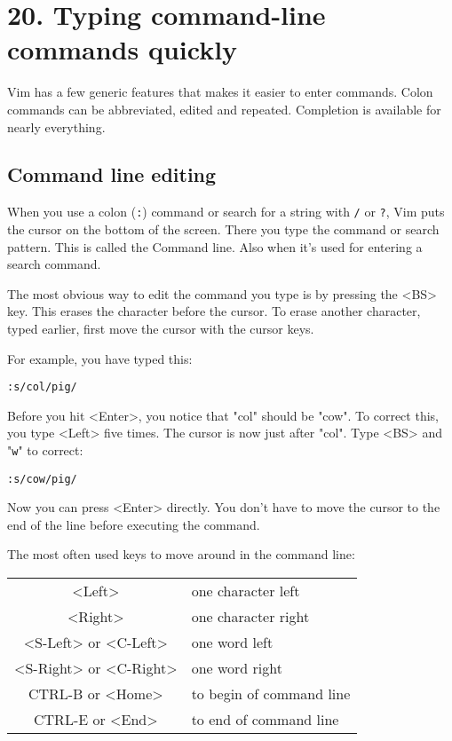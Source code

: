 \section{20. Typing command-line commands quickly}
Vim has a few generic features that makes it easier to enter commands.  Colon
commands can be abbreviated, edited and repeated.  Completion is available for
nearly everything.
\subsection{Command line editing}
When you use a colon (\verb!:!) command or search for a string with \verb!/! or \verb!?!, Vim puts the cursor on the bottom of the screen.
There you type the command or search pattern.
This is called the Command line.
Also when it's used for entering a search command.

The most obvious way to edit the command you type is by pressing the <BS> key.
This erases the character before the cursor.
To erase another character, typed earlier, first move the cursor with the cursor keys.

For example, you have typed this:

\begin{Verbatim}[samepage=true]
 :s/col/pig/
\end{Verbatim}

Before you hit <Enter>, you notice that "col" should be "cow".
To correct this, you type <Left> five times.
The cursor is now just after "col".
Type <BS> and "\verb!w!" to correct:

\begin{Verbatim}[samepage=true]
 :s/cow/pig/
\end{Verbatim}

Now you can press <Enter> directly.
You don't have to move the cursor to the end of the line before executing the command.

The most often used keys to move around in the command line:

\begin{center} \begin{longtable}{c l}
				<Left> & one character left \\
				<Right> & one character right\\
				<S-Left> or <C-Left> & one word left\\
				<S-Right> or <C-Right> & one word right\\
				CTRL-B or <Home> & to begin of command line\\
				CTRL-E or <End> & to end of command line\\
\end{longtable} \end{center}

